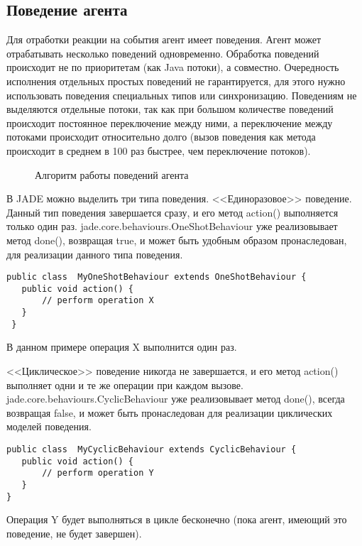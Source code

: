 \subsection{Поведение агента}
Для отработки реакции на события агент имеет поведения. Агент может отрабатывать несколько поведений одновременно. Обработка поведений происходит не по приоритетам (как Java потоки), а совместно. Очередность исполнения отдельных простых поведений не гарантируется, для этого нужно использовать поведения специальных типов или синхронизацию.
Поведениям не выделяются отдельные потоки, так как при большом количестве поведений происходит постоянное переключение между ними, а переключение между потоками происходит относительно долго (вызов поведения как метода происходит в среднем в 100 раз быстрее, чем переключение потоков).
\begin{figure}[h!]
\caption{Алгоритм работы поведений агента}
\label{2:behs}
\end{figure}
В JADE можно выделить три типа поведения.
<<Единоразовое>> поведение. Данный тип поведения завершается сразу, и его метод action() выполняется только один раз. jade.core.behaviours.OneShotBehaviour уже реализовывает метод done(), возвращая true, и может быть удобным образом пронаследован, для реализации данного типа поведения.
\begin{lstlisting}
public class  MyOneShotBehaviour extends OneShotBehaviour { 
   public void action() { 
       // perform operation X 
   } 
 }
\end{lstlisting}
В данном примере операция X выполнится один раз.

<<Циклическое>> поведение никогда не завершается, и его метод action() выполняет одни и те же операции при каждом вызове. jade.core.behaviours.CyclicBehaviour уже реализовывает метод done(), всегда возвращая false, и может быть пронаследован для реализации циклических моделей поведения.
\begin{lstlisting}
public class  MyCyclicBehaviour extends CyclicBehaviour { 
   public void action() { 
       // perform operation Y 
   } 
}
\end{lstlisting}
Операция Y будет выполняться в цикле бесконечно (пока агент, имеющий это поведение, не будет завершен).

